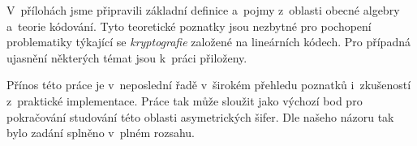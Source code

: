 \documentclass[thesis=M,czech,hidelinks]{FITthesis}[2012/06/26]
\newcommand{\0}{{\textcolor[gray]{0.75}{0}}}
\begin{document}
\begin{conclusion}
V~přílohách jsme připravili základní definice a~pojmy z~oblasti obecné
algebry a~teorie kódování. Tyto teoretické poznatky jsou nezbytné pro pochopení
problematiky týkající se \emph{kryptografie} založené na lineárních kódech.
Pro případná ujasnění některých témat jsou k~práci přiloženy.

\vspace{0.5cm}

Přínos této práce je v~neposlední řadě v~širokém přehledu poznatků i~zkušeností
z~praktické implementace. Práce tak může sloužit jako výchozí bod pro
pokračování studování této oblasti asymetrických šifer. Dle našeho názoru tak
bylo zadání splněno v~plném rozsahu.


\end{conclusion}




\end{document}
